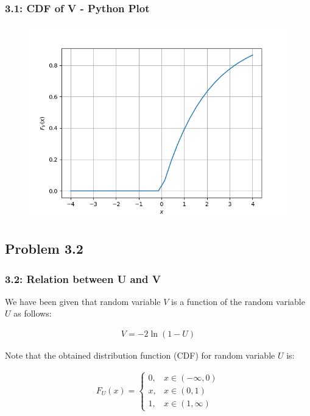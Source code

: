 \documentclass{beamer}
\begin{document}
\begin{frame}
	\frametitle{3.1: CDF of V - Python Plot}
	\begin{figure}
		\centerline{\includegraphics[width=\textheight]{../figs/log_cdf.png}}
		\label{fig4}
	\end{figure}
	
\end{frame}	

\subsection{Problem 3.2}

\begin{frame}
	\frametitle{3.2: Relation between U and V}

	We have been given that random variable $V$ is a function of the random variable $U$ as follows:
	
	\begin{align}
		V = -2\ln{(1 - U)}
		\label{eq:FuncRV}
	\end{align}

	Note that the obtained distribution function (CDF) for random variable $U$ is:

	\begin{align}
		F_U(x) = 
		\begin{cases}
			0, & x \in (-\infty, 0) \\
			x, & x \in (0, 1) \\
			1, & x \in (1, \infty)
		\end{cases}
		\label{eq:CDF_U}
	\end{align}
\end{frame}
\end{document}
